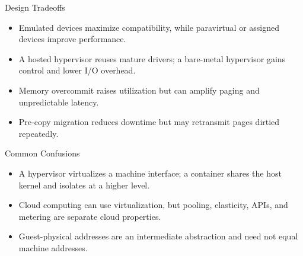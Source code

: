 \documentclass[10pt,letterpaper]{article}
\begin{document}
\begin{studybox}{Design Tradeoffs}
\begin{itemize}
  \item Emulated devices maximize compatibility, while paravirtual or assigned devices improve performance.
  \item A hosted hypervisor reuses mature drivers; a bare-metal hypervisor gains control and lower I/O overhead.
  \item Memory overcommit raises utilization but can amplify paging and unpredictable latency.
  \item Pre-copy migration reduces downtime but may retransmit pages dirtied repeatedly.
\end{itemize}
\end{studybox}

\begin{studybox}{Common Confusions}
\begin{itemize}
  \item A hypervisor virtualizes a machine interface; a container shares the host kernel and isolates at a higher level.
  \item Cloud computing can use virtualization, but pooling, elasticity, APIs, and metering are separate cloud properties.
  \item Guest-physical addresses are an intermediate abstraction and need not equal machine addresses.
\end{itemize}
\end{studybox}
\end{document}
